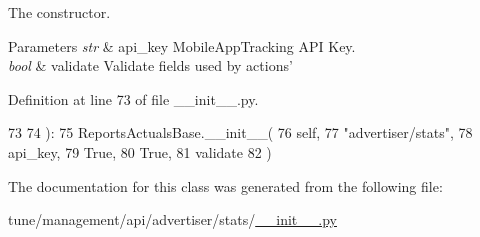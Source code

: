 The constructor. 


\begin{DoxyParams}{Parameters}
{\em str} & api\-\_\-key Mobile\-App\-Tracking A\-P\-I Key. \\
\hline
{\em bool} & validate Validate fields used by actions' \\
\hline
\end{DoxyParams}


Definition at line 73 of file \-\_\-\-\_\-init\-\_\-\-\_\-.\-py.


\begin{DoxyCode}
73 
74         ):
75         ReportsActualsBase.\_\_init\_\_(
76             self,
77             \textcolor{stringliteral}{"advertiser/stats"},
78             api\_key,
79             \textcolor{keyword}{True},
80             \textcolor{keyword}{True},
81             validate
82         )
\end{DoxyCode}


The documentation for this class was generated from the following file\-:\begin{DoxyCompactItemize}
\item 
tune/management/api/advertiser/stats/\hyperlink{management_2api_2advertiser_2stats_2____init_____8py}{\-\_\-\-\_\-init\-\_\-\-\_\-.\-py}\end{DoxyCompactItemize}
